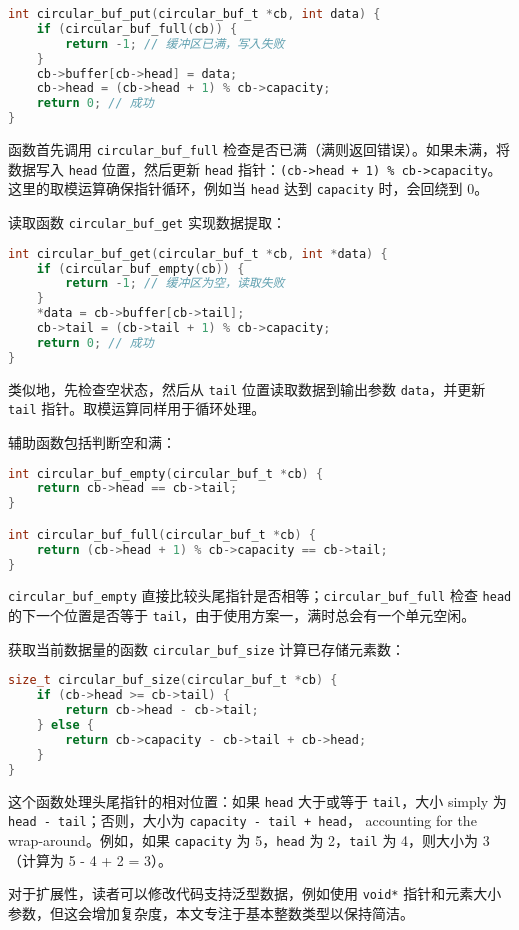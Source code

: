\begin{lstlisting}[language=c]
int circular_buf_put(circular_buf_t *cb, int data) {
    if (circular_buf_full(cb)) {
        return -1; // 缓冲区已满，写入失败
    }
    cb->buffer[cb->head] = data;
    cb->head = (cb->head + 1) % cb->capacity;
    return 0; // 成功
}
\end{lstlisting}
函数首先调用 \texttt{circular\_{}buf\_{}full} 检查是否已满（满则返回错误）。如果未满，将数据写入 \texttt{head} 位置，然后更新 \texttt{head} 指针：\texttt{(cb->head + 1) \%{} cb->capacity}。这里的取模运算确保指针循环，例如当 \texttt{head} 达到 \texttt{capacity} 时，会回绕到 0。\par
读取函数 \texttt{circular\_{}buf\_{}get} 实现数据提取：\par
\begin{lstlisting}[language=c]
int circular_buf_get(circular_buf_t *cb, int *data) {
    if (circular_buf_empty(cb)) {
        return -1; // 缓冲区为空，读取失败
    }
    *data = cb->buffer[cb->tail];
    cb->tail = (cb->tail + 1) % cb->capacity;
    return 0; // 成功
}
\end{lstlisting}
类似地，先检查空状态，然后从 \texttt{tail} 位置读取数据到输出参数 \texttt{data}，并更新 \texttt{tail} 指针。取模运算同样用于循环处理。\par
辅助函数包括判断空和满：\par
\begin{lstlisting}[language=c]
int circular_buf_empty(circular_buf_t *cb) {
    return cb->head == cb->tail;
}

int circular_buf_full(circular_buf_t *cb) {
    return (cb->head + 1) % cb->capacity == cb->tail;
}
\end{lstlisting}
\texttt{circular\_{}buf\_{}empty} 直接比较头尾指针是否相等；\texttt{circular\_{}buf\_{}full} 检查 \texttt{head} 的下一个位置是否等于 \texttt{tail}，由于使用方案一，满时总会有一个单元空闲。\par
获取当前数据量的函数 \texttt{circular\_{}buf\_{}size} 计算已存储元素数：\par
\begin{lstlisting}[language=c]
size_t circular_buf_size(circular_buf_t *cb) {
    if (cb->head >= cb->tail) {
        return cb->head - cb->tail;
    } else {
        return cb->capacity - cb->tail + cb->head;
    }
}
\end{lstlisting}
这个函数处理头尾指针的相对位置：如果 \texttt{head} 大于或等于 \texttt{tail}，大小 simply 为 \texttt{head - tail}；否则，大小为 \texttt{capacity - tail + head}， accounting for the wrap-around。例如，如果 \texttt{capacity} 为 5，\texttt{head} 为 2，\texttt{tail} 为 4，则大小为 3（计算为 5 - 4 + 2 = 3）。\par
对于扩展性，读者可以修改代码支持泛型数据，例如使用 \texttt{void*} 指针和元素大小参数，但这会增加复杂度，本文专注于基本整数类型以保持简洁。\par
